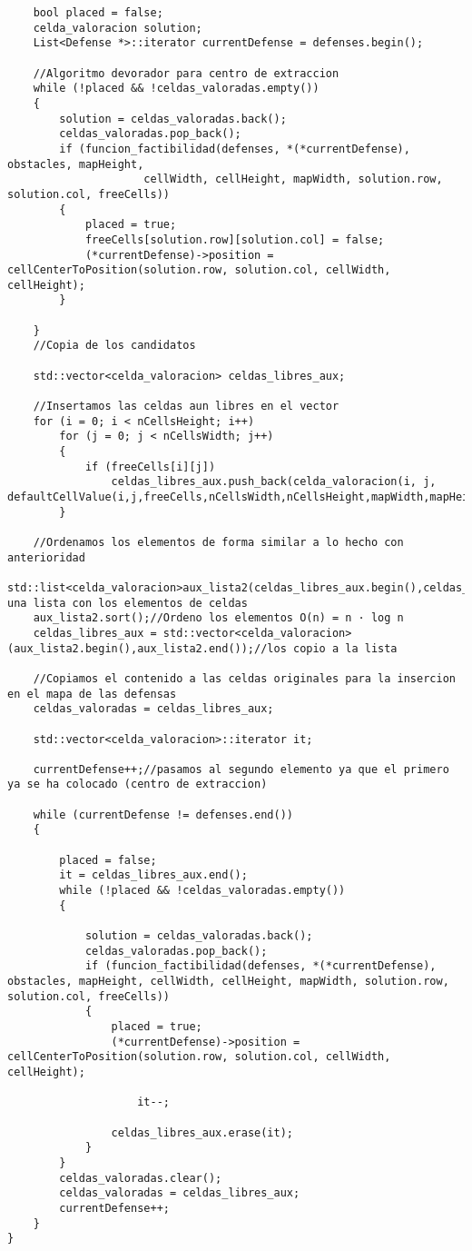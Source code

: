 \begin{lstlisting}
    bool placed = false;
    celda_valoracion solution;
    List<Defense *>::iterator currentDefense = defenses.begin();

    //Algoritmo devorador para centro de extraccion
    while (!placed && !celdas_valoradas.empty())
    {
        solution = celdas_valoradas.back();
        celdas_valoradas.pop_back();
        if (funcion_factibilidad(defenses, *(*currentDefense), obstacles, mapHeight,
                     cellWidth, cellHeight, mapWidth, solution.row, solution.col, freeCells))
        {
            placed = true;
            freeCells[solution.row][solution.col] = false;
            (*currentDefense)->position = cellCenterToPosition(solution.row, solution.col, cellWidth, cellHeight);
        }
        
    }
    //Copia de los candidatos

    std::vector<celda_valoracion> celdas_libres_aux;

    //Insertamos las celdas aun libres en el vector 
    for (i = 0; i < nCellsHeight; i++)
        for (j = 0; j < nCellsWidth; j++)
        {
            if (freeCells[i][j])
                celdas_libres_aux.push_back(celda_valoracion(i, j, defaultCellValue(i,j,freeCells,nCellsWidth,nCellsHeight,mapWidth,mapHeight,obstacles,defenses)));
        }

    //Ordenamos los elementos de forma similar a lo hecho con anterioridad
    std::list<celda_valoracion>aux_lista2(celdas_libres_aux.begin(),celdas_libres_aux.end());//Creo una lista con los elementos de celdas
    aux_lista2.sort();//Ordeno los elementos O(n) = n · log n
    celdas_libres_aux = std::vector<celda_valoracion>(aux_lista2.begin(),aux_lista2.end());//los copio a la lista

    //Copiamos el contenido a las celdas originales para la insercion en el mapa de las defensas
    celdas_valoradas = celdas_libres_aux;

    std::vector<celda_valoracion>::iterator it;
    
    currentDefense++;//pasamos al segundo elemento ya que el primero ya se ha colocado (centro de extraccion)

    while (currentDefense != defenses.end())
    {
        
        placed = false;
        it = celdas_libres_aux.end();
        while (!placed && !celdas_valoradas.empty())
        {
            
            solution = celdas_valoradas.back();
            celdas_valoradas.pop_back();
            if (funcion_factibilidad(defenses, *(*currentDefense), obstacles, mapHeight, cellWidth, cellHeight, mapWidth, solution.row, solution.col, freeCells))
            {
                placed = true;
                (*currentDefense)->position = cellCenterToPosition(solution.row, solution.col, cellWidth, cellHeight);
                
                    it--;
                
                celdas_libres_aux.erase(it);
            }
        }
        celdas_valoradas.clear();
        celdas_valoradas = celdas_libres_aux;
        currentDefense++;
    }
}
\end{lstlisting}